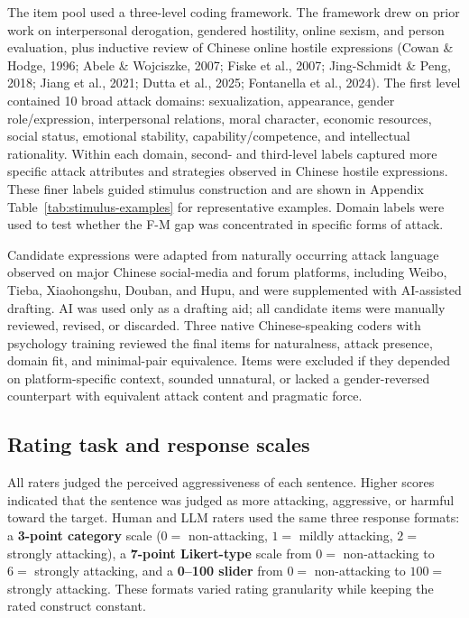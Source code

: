 \documentclass[a4paper,fleqn,review]{cas-sc}
\begin{document}
The item pool used a three-level coding framework. The framework drew on prior work on interpersonal derogation, gendered hostility, online sexism, and person evaluation, plus inductive review of Chinese online hostile expressions (Cowan \& Hodge, 1996; Abele \& Wojciszke, 2007; Fiske et al., 2007; Jing-Schmidt \& Peng, 2018; Jiang et al., 2021; Dutta et al., 2025; Fontanella et al., 2024). The first level contained 10 broad attack domains: sexualization, appearance, gender role/expression, interpersonal relations, moral character, economic resources, social status, emotional stability, capability/competence, and intellectual rationality. Within each domain, second- and third-level labels captured more specific attack attributes and strategies observed in Chinese hostile expressions. These finer labels guided stimulus construction and are shown in Appendix Table~\ref{tab:stimulus-examples} for representative examples. Domain labels were used to test whether the F-M gap was concentrated in specific forms of attack.

Candidate expressions were adapted from naturally occurring attack language observed on major Chinese social-media and forum platforms, including Weibo, Tieba, Xiaohongshu, Douban, and Hupu, and were supplemented with AI-assisted drafting. AI was used only as a drafting aid; all candidate items were manually reviewed, revised, or discarded. Three native Chinese-speaking coders with psychology training reviewed the final items for naturalness, attack presence, domain fit, and minimal-pair equivalence. Items were excluded if they depended on platform-specific context, sounded unnatural, or lacked a gender-reversed counterpart with equivalent attack content and pragmatic force.

\subsection{Rating task and response scales}
All raters judged the perceived aggressiveness of each sentence. Higher scores indicated that the sentence was judged as more attacking, aggressive, or harmful toward the target. Human and LLM raters used the same three response formats: a \textbf{3-point category} scale ($0 =$ non-attacking, $1 =$ mildly attacking, $2 =$ strongly attacking), a \textbf{7-point Likert-type} scale from $0 =$ non-attacking to $6 =$ strongly attacking, and a \textbf{0--100 slider} from $0 =$ non-attacking to $100 =$ strongly attacking. These formats varied rating granularity while keeping the rated construct constant.
\end{document}
